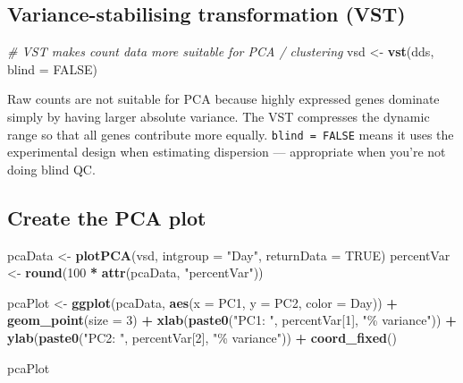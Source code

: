 \documentclass[
]{article}
\newenvironment{Shaded}{\begin{snugshade}}{\end{snugshade}}
\newcommand{\AttributeTok}[1]{\textcolor[rgb]{0.13,0.29,0.53}{#1}}
\newcommand{\CommentTok}[1]{\textcolor[rgb]{0.56,0.35,0.01}{\textit{#1}}}
\newcommand{\ConstantTok}[1]{\textcolor[rgb]{0.56,0.35,0.01}{#1}}
\newcommand{\DecValTok}[1]{\textcolor[rgb]{0.00,0.00,0.81}{#1}}
\newcommand{\FunctionTok}[1]{\textcolor[rgb]{0.13,0.29,0.53}{\textbf{#1}}}
\newcommand{\NormalTok}[1]{#1}
\newcommand{\OtherTok}[1]{\textcolor[rgb]{0.56,0.35,0.01}{#1}}
\newcommand{\SpecialCharTok}[1]{\textcolor[rgb]{0.81,0.36,0.00}{\textbf{#1}}}
\newcommand{\StringTok}[1]{\textcolor[rgb]{0.31,0.60,0.02}{#1}}
\begin{document}
\subsection{Variance-stabilising transformation
(VST)}\label{variance-stabilising-transformation-vst}

\begin{Shaded}
\begin{Highlighting}[]
\CommentTok{\# VST makes count data more suitable for PCA / clustering}
\NormalTok{vsd }\OtherTok{\textless{}{-}} \FunctionTok{vst}\NormalTok{(dds, }\AttributeTok{blind =} \ConstantTok{FALSE}\NormalTok{)}
\end{Highlighting}
\end{Shaded}

Raw counts are not suitable for PCA because highly expressed genes
dominate simply by having larger absolute variance. The VST compresses
the dynamic range so that all genes contribute more equally.
\texttt{blind\ =\ FALSE} means it uses the experimental design when
estimating dispersion --- appropriate when you're not doing blind QC.

\subsection{Create the PCA plot}\label{create-the-pca-plot}

\begin{Shaded}
\begin{Highlighting}[]
\NormalTok{pcaData   }\OtherTok{\textless{}{-}} \FunctionTok{plotPCA}\NormalTok{(vsd, }\AttributeTok{intgroup =} \StringTok{"Day"}\NormalTok{, }\AttributeTok{returnData =} \ConstantTok{TRUE}\NormalTok{)}
\NormalTok{percentVar }\OtherTok{\textless{}{-}} \FunctionTok{round}\NormalTok{(}\DecValTok{100} \SpecialCharTok{*} \FunctionTok{attr}\NormalTok{(pcaData, }\StringTok{"percentVar"}\NormalTok{))}

\NormalTok{pcaPlot }\OtherTok{\textless{}{-}} \FunctionTok{ggplot}\NormalTok{(pcaData, }\FunctionTok{aes}\NormalTok{(}\AttributeTok{x =}\NormalTok{ PC1, }\AttributeTok{y =}\NormalTok{ PC2, }\AttributeTok{color =}\NormalTok{ Day)) }\SpecialCharTok{+}
  \FunctionTok{geom\_point}\NormalTok{(}\AttributeTok{size =} \DecValTok{3}\NormalTok{) }\SpecialCharTok{+}
  \FunctionTok{xlab}\NormalTok{(}\FunctionTok{paste0}\NormalTok{(}\StringTok{"PC1: "}\NormalTok{, percentVar[}\DecValTok{1}\NormalTok{], }\StringTok{"\% variance"}\NormalTok{)) }\SpecialCharTok{+}
  \FunctionTok{ylab}\NormalTok{(}\FunctionTok{paste0}\NormalTok{(}\StringTok{"PC2: "}\NormalTok{, percentVar[}\DecValTok{2}\NormalTok{], }\StringTok{"\% variance"}\NormalTok{)) }\SpecialCharTok{+}
  \FunctionTok{coord\_fixed}\NormalTok{()}

\NormalTok{pcaPlot}
\end{Highlighting}
\end{Shaded}
\end{document}
